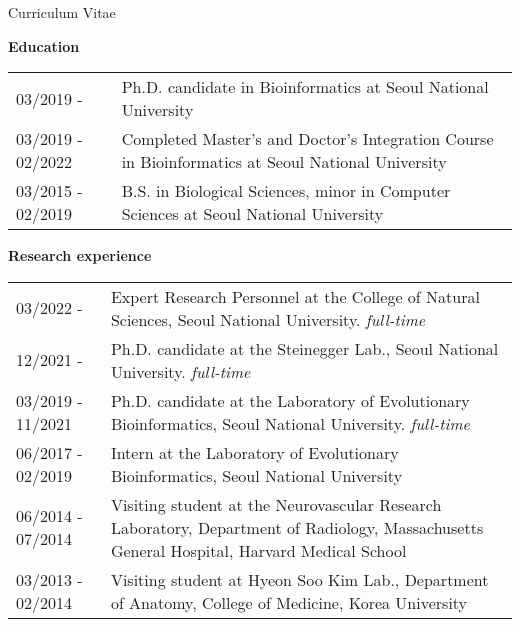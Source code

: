 \documentclass{resume} %
\begin{document}


\setcounter{tocdepth}{1}

\pagestyle{plain}
\setcounter{page}{1}

\setlength{\oddsidemargin}{-0.2cm}
\setlength{\evensidemargin}{-0.2cm}
\setlength{\linewidth}{16.5cm}
\setlength{\textheight}{26cm}
\setlength{\tabcolsep}{0cm}


\begin{rSection}{Curriculum Vitae}
\vspace{2mm}

{\bf Education}\vspace{1mm}

\begin{tabular}{p{3.6cm}p{13.0cm}}
03/2019 - & Ph.D. candidate in Bioinformatics at Seoul National University
\\[1.mm]
03/2019 - 02/2022 & Completed Master's and Doctor's Integration Course in Bioinformatics at Seoul National University
\\[1.mm]
03/2015 - 02/2019 & B.S. in Biological Sciences, minor in Computer Sciences at Seoul National University 
\\[1mm]
\end{tabular}
\vspace{1mm}

{\bf Research experience}\vspace{1mm}

\begin{tabular}{p{3.6cm}p{13.0cm}}
03/2022 - & Expert Research Personnel at the College of Natural Sciences, Seoul National University. \textit{full-time}
\\[1.mm]
12/2021 - & Ph.D. candidate at the Steinegger Lab., Seoul National University. \textit{full-time}
\\[1.mm]
03/2019 - 11/2021 & Ph.D. candidate at the Laboratory of Evolutionary Bioinformatics, Seoul National University. \textit{full-time}
\\[1.mm]
06/2017 - 02/2019 & Intern at the Laboratory of Evolutionary Bioinformatics, Seoul National University
\\[1.mm]
06/2014 - 07/2014 & Visiting student at the Neurovascular Research Laboratory, Department of Radiology, Massachusetts General Hospital, Harvard Medical School
\\[1.mm]
03/2013 - 02/2014 & Visiting student at Hyeon Soo Kim Lab., Department of Anatomy, College of Medicine, Korea University
\\[1.mm]
\end{tabular}
\vspace{1mm}
\end{rSection}
\end{document}

